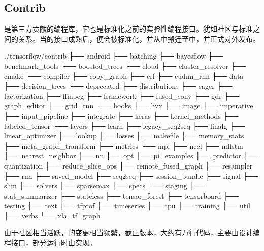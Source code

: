 \begin{content}
\subsection{Contrib}

是第三方贡献的编程库，它也是\tf{}标准化之前的实验性编程接口。犹如社区与标准之间的关系。当的接口成熟后，便会被\tf{}标准化，并从中搬迁至中，并正式对外发布。

\begin{leftbar}
\begin{python}[caption={Contrib源码结构}]
./tensorflow/contrib
├── android
├── batching
├── bayesflow
├── benchmark_tools
├── boosted_trees
├── cloud
├── cluster_resolver
├── cmake
├── compiler
├── copy_graph
├── crf
├── cudnn_rnn
├── data
├── decision_trees
├── deprecated
├── distributions
├── eager
├── factorization
├── ffmpeg
├── framework
├── fused_conv
├── gdr
├── graph_editor
├── grid_rnn
├── hooks
├── hvx
├── image
├── imperative
├── input_pipeline
├── integrate
├── keras
├── kernel_methods
├── labeled_tensor
├── layers
├── learn
├── legacy_seq2seq
├── linalg
├── linear_optimizer
├── lookup
├── losses
├── makefile
├── memory_stats
├── meta_graph_transform
├── metrics
├── mpi
├── nccl
├── ndlstm
├── nearest_neighbor
├── nn
├── opt
├── pi_examples
├── predictor
├── quantization
├── reduce_slice_ops
├── remote_fused_graph
├── resampler
├── rnn
├── saved_model
├── seq2seq
├── session_bundle
├── signal
├── slim
├── solvers
├── sparsemax
├── specs
├── staging
├── stat_summarizer
├── stateless
├── tensor_forest
├── tensorboard
├── testing
├── text
├── tfprof
├── timeseries
├── tpu
├── training
├── util
├── verbs
└── xla_tf_graph
\end{python}
\end{leftbar}

由于\tf{}社区相当活跃，的变更相当频繁，截止版本，大约有万行代码，主要由设计编程接口，部分运行时由实现。


\end{content}

